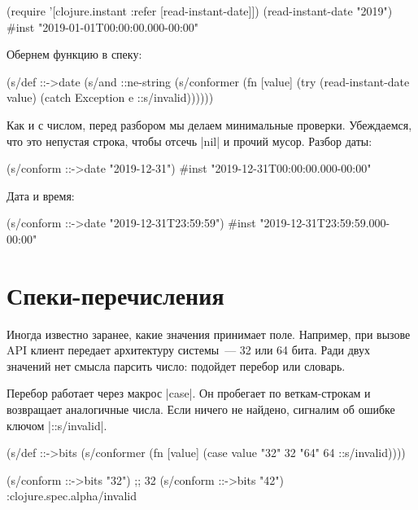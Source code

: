 \begin{english}
  \begin{clojure}
(require '[clojure.instant :refer [read-instant-date]])
(read-instant-date "2019")
#inst "2019-01-01T00:00:00.000-00:00"
  \end{clojure}
\end{english}

Обернем функцию в спеку:

\begin{english}
  \begin{clojure}
(s/def ::->date
  (s/and
   ::ne-string
   (s/conformer
    (fn [value]
      (try
        (read-instant-date value)
        (catch Exception e
          ::s/invalid))))))
  \end{clojure}
\end{english}

Как и с числом, перед разбором мы делаем минимальные проверки. Убеждаемся, что
это непустая строка, чтобы отсечь \spverb|nil| и прочий мусор. Разбор даты:

\begin{english}
  \begin{clojure}
(s/conform ::->date "2019-12-31")
#inst "2019-12-31T00:00:00.000-00:00"
  \end{clojure}
\end{english}

\noindent
Дата и время:

\begin{english}
  \begin{clojure}
(s/conform ::->date "2019-12-31T23:59:59")
#inst "2019-12-31T23:59:59.000-00:00"
  \end{clojure}
\end{english}

\section{Спеки-перечисления}

Иногда известно заранее, какие значения принимает поле. Например, при вызове API
клиент передает архитектуру системы~--- 32 или 64 бита. Ради двух значений нет
смысла парсить число: подойдет перебор или словарь.

Перебор работает через макрос \spverb|case|. Он пробегает по веткам-строкам и
возвращает аналогичные числа. Если ничего не найдено, сигналим об ошибке ключом
\spverb|::s/invalid|.

\begin{english}
  \begin{clojure}
(s/def ::->bits
  (s/conformer
   (fn [value]
     (case value
       "32" 32
       "64" 64
       ::s/invalid))))

(s/conform ::->bits "32") ;; 32
(s/conform ::->bits "42") :clojure.spec.alpha/invalid
  \end{clojure}
\end{english}

